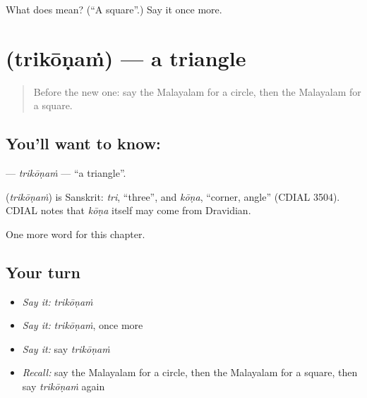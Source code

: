 \begin{tcolorbox}[breakable,colback=teal!4,colframe=teal!35!black,title={Before you move on}]
What does  mean? (\textquotedblleft{}A square\textquotedblright{}.) Say it once more.
\end{tcolorbox}
\section[\texorpdfstring{\ml{ത്രികോണം} (trikōṇaṁ)}{ത്രികോണം (trikōṇaṁ)}]{ (trikōṇaṁ) — a triangle}

\label{lesson:ML-C258-trikonam}



\begin{quote}
Before the new one: say the Malayalam for a circle, then the Malayalam for a square.
\end{quote}

\subsection*{You'll want to know: }
\textbf{} — \emph{trikōṇaṁ} — \textquotedblleft{}a triangle\textquotedblright{}.

\begin{cousinweb}
\textbf{} (\emph{trikōṇaṁ}) is Sanskrit: \emph{tri}, \textquotedblleft{}three\textquotedblright{}, and \emph{kōṇa}, \textquotedblleft{}corner, angle\textquotedblright{} (CDIAL 3504). CDIAL notes that \emph{kōṇa} itself may come from Dravidian.
\end{cousinweb}

\begin{grammarlens}[title={What you've built}]
One more word for this chapter.
\end{grammarlens}

\subsection*{Your turn}
\begin{itemize}
\raggedright
  \item \emph{Say it:} \emph{trikōṇaṁ}
  \item \emph{Say it:} \emph{trikōṇaṁ}, once more
  \item \emph{Say it:} say \emph{trikōṇaṁ}
  \item \emph{Recall:} say the Malayalam for a circle, then the Malayalam for a square, then say \emph{trikōṇaṁ} again
\end{itemize}

